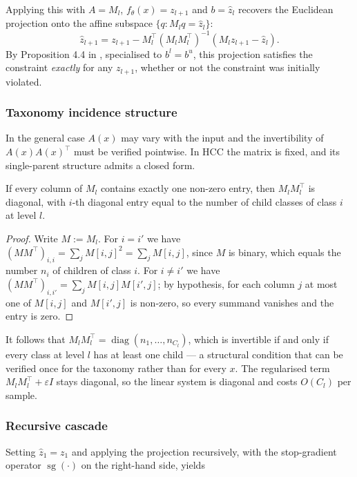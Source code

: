 Applying this with $A=M_l$, $f_\theta(x)=z_{l+1}$ and $b=\hat z_l$ recovers
the Euclidean projection onto the affine subspace $\{q:M_lq=\hat z_l\}$:
\[
\hat z_{l+1}
=
z_{l+1}
-
M_l^{\top}
\left(
M_lM_l^{\top}
\right)^{-1}
\left(
M_lz_{l+1}-\hat z_l
\right).
\]
By Proposition 4.4 in \cite{min2024hardnet}, specialised to $b^l=b^u$, this
projection satisfies the constraint \emph{exactly} for any $z_{l+1}$, whether or
not the constraint was initially violated.

\subsubsection{Taxonomy incidence structure}

In the general case
$A(x)$ may vary with the input and the invertibility of $A(x)A(x)^{\top}$ must be
verified pointwise. In HCC the matrix is fixed, and its single-parent structure
admits a closed form.

\begin{lemma}
\label{lemma:diag}
If every column of $M_l$ contains exactly one non-zero entry, then $M_lM_l^{\top}$ is diagonal, with $i$-th diagonal entry equal to the number of child classes of class $i$ at level $l$.
\end{lemma}
\begin{proof}
Write $M:=M_l$. For $i=i'$ we have $(MM^\top)_{i,i}=\sum_j M[i,j]^2=\sum_j M[i,j]$, since $M$ is binary, which equals the number $n_i$ of children of class $i$. For $i\ne i'$ we have $(MM^\top)_{i,i'}=\sum_j M[i,j]M[i',j]$; by hypothesis, for each column $j$ at most one of $M[i,j]$ and $M[i',j]$ is non-zero, so every summand vanishes and the entry is zero.
\end{proof}

It follows that $M_lM_l^{\top}=\operatorname{diag}(n_1,\dots,n_{C_l})$,
which is invertible if and only if every class at level $l$ has at least one child
--- a structural condition that can be verified once for the taxonomy rather
than for every $x$. The regularised term
$M_lM_l^{\top}+\varepsilon I$ stays diagonal, so the linear system
is diagonal and costs $O(C_l)$ per sample.

\subsubsection{Recursive cascade}

Setting $\hat z_1=z_1$ and applying the projection
recursively, with the stop-gradient operator $\operatorname{sg}(\cdot)$ on the
right-hand side, yields

